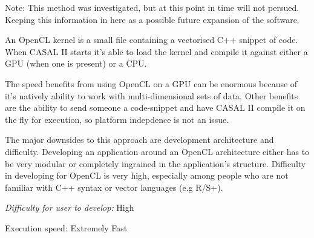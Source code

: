 \documentclass[a4paper,11pt,twoside,pdftex,draft]{article}
\begin{document}
Note: This method was investigated, but at this point in time will not
persued. Keeping this information in here as a possible future expansion
of the software.

An OpenCL kernel is a small file containing a vectorised C++ snippet of
code. When CASAL II starts it's able to load the kernel and compile it
against either a GPU (when one is present) or a CPU.

The speed benefits from using OpenCL on a GPU can be enormous because of
it's natively ability to work with multi-dimensional sets of data. Other
benefits are the ability to send someone a code-snippet and have CASAL
II compile it on the fly for execution, so platform indepdence is not an
issue.

The major downsides to this approach are development architecture and
difficulty. Developing an application around an OpenCL architecture
either has to be very modular or completely ingrained in the
application's structure. Difficulty in developing for OpenCL is very
high, especially among people who are not familiar with C++ syntax or
vector languages (e.g R/S+).

\emph{Difficulty for user to develop:} High

Execution speed: Extremely Fast
\end{document}
